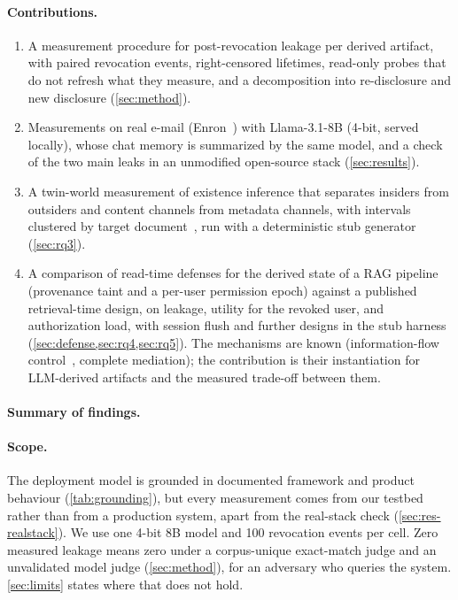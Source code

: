 \paragraph{Contributions.}
\begin{enumerate}
\item A measurement procedure for post-revocation leakage per derived artifact, with paired
revocation events, right-censored lifetimes, read-only probes that do not refresh what they
measure, and a decomposition into re-disclosure and new disclosure (\cref{sec:method}).
\item Measurements on real e-mail (Enron~\cite{klimt2004enron,ryan2025enronqa}) with
Llama-3.1-8B (4-bit, served locally), whose chat memory is summarized by the same model, and a
check of the two main leaks in an unmodified open-source stack (\cref{sec:results}).
\item A twin-world measurement of existence inference that separates insiders from outsiders and
content channels from metadata channels, with intervals clustered by target
document~\cite{obuchowski1997clustered}, run with a deterministic stub generator (\cref{sec:rq3}).
\item A comparison of read-time defenses for the derived state of a RAG pipeline (provenance taint
and a per-user permission epoch) against a published retrieval-time design, on leakage, utility for
the revoked user, and authorization load, with session flush and further designs in the stub harness
(\cref{sec:defense,sec:rq4,sec:rq5}). The mechanisms are known
(information-flow control~\cite{myers1997decentralized,elnikety2016thoth,costa2026fides}, complete
mediation); the contribution is their instantiation for LLM-derived artifacts and the measured
trade-off between them.
\end{enumerate}

\paragraph{Summary of findings.}

\paragraph{Scope.}
The deployment model is grounded in documented framework and product behaviour
(\cref{tab:grounding}), but every measurement comes from our testbed rather than from a production
system, apart from the real-stack check (\cref{sec:res-realstack}). We use one 4-bit 8B model and
100 revocation events per cell. Zero measured leakage means zero under a corpus-unique exact-match
judge and an unvalidated model judge (\cref{sec:method}), for an adversary who queries the system.
\cref{sec:limits} states where that does not hold.
